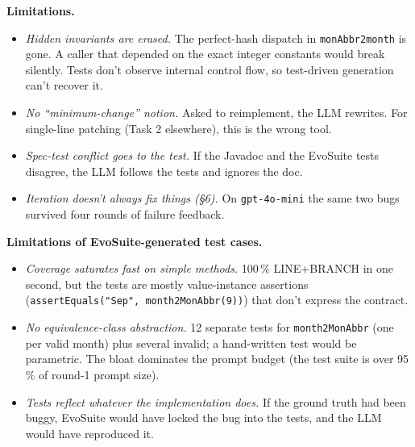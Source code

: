 \documentclass[manuscript,review,nonacm]{acmart}
\begin{document}
\textbf{Limitations.}
\begin{itemize}\itemsep1pt
\item \emph{Hidden invariants are erased.} The perfect-hash dispatch
      in \texttt{monAbbr2month} is gone. A caller that depended on
      the exact integer constants would break silently. Tests don't
      observe internal control flow, so test-driven generation can't
      recover it.
\item \emph{No ``minimum-change'' notion.} Asked to reimplement, the
      LLM rewrites. For single-line patching (Task 2 elsewhere),
      this is the wrong tool.
\item \emph{Spec-test conflict goes to the test.} If the Javadoc and
      the EvoSuite tests disagree, the LLM follows the tests and
      ignores the doc.
\item \emph{Iteration doesn't always fix things (\S6).} On
      \texttt{gpt-4o-mini} the same two bugs survived four rounds of
      failure feedback.
\end{itemize}

\textbf{Limitations of EvoSuite-generated test cases.}
\begin{itemize}\itemsep1pt
\item \emph{Coverage saturates fast on simple methods.} 100\,\%
      LINE+BRANCH in one second, but the tests are mostly
      value-instance assertions
      (\texttt{assertEquals("Sep", month2MonAbbr(9))}) that don't
      express the contract.
\item \emph{No equivalence-class abstraction.} 12 separate tests for
      \texttt{month2MonAbbr} (one per valid month) plus several
      invalid; a hand-written test would be parametric. The bloat
      dominates the prompt budget (the test suite is over 95\,\% of
      round-1 prompt size).
\item \emph{Tests reflect whatever the implementation does.} If the
      ground truth had been buggy, EvoSuite would have locked the bug
      into the tests, and the LLM would have reproduced it.
\end{itemize}
\end{document}
